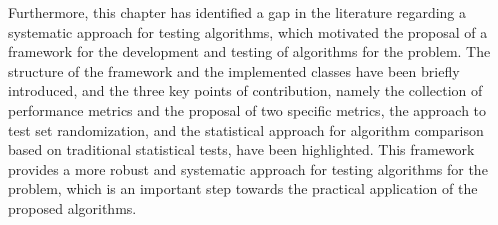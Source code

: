 		Furthermore, this chapter has identified a gap in the literature regarding a systematic approach for testing algorithms, which motivated the proposal of a framework for the development and testing of algorithms for the problem. The structure of the framework and the implemented classes have been briefly introduced, and the three key points of contribution, namely the collection of performance metrics and the proposal of two specific metrics, the approach to test set randomization, and the statistical approach for algorithm comparison based on traditional statistical tests, have been highlighted. This framework provides a more robust and systematic approach for testing algorithms for the problem, which is an important step towards the practical application of the proposed algorithms.